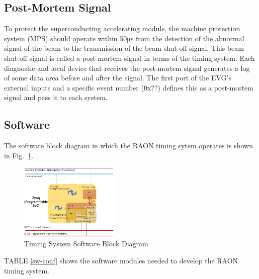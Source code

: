 \documentclass[journal,reqno]{IEEEtran}
\begin{document}
\subsection{Post-Mortem Signal}
To protect the superconducting accelerating module, the machine protection system (MPS) should operate within 50μs from the detection of the abnormal signal of the beam to the transmission of the beam shut-off signal. This beam shut-off signal is called a post-mortem signal in terms of the timing system. Each diagnostic and local device that receives the post-mortem signal generates a log of some data area before and after the signal. The first port of the EVG's external inputs and a specific event number (0x??) defines this as a post-mortem signal and pass it to each system.

\subsection{Software}
The software block diagram in which the RAON timing sytem operates is shown in Fig.~\ref{timing_sw_block}.


\begin{figure}[!htb]
	\centering
	\includegraphics*[width=0.42\textwidth, height=0.35\textwidth]{img24.png}
	\caption{Timing System Software Block Diagram}
	\label{timing_sw_block}
\end{figure}

TABLE \ref{sw-conf} shows the software modules needed to develop the RAON timing system.
\end{document}

